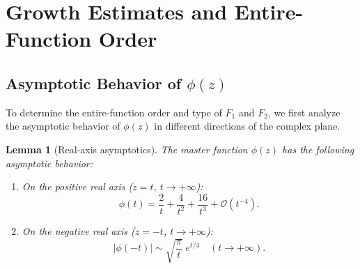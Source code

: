 \documentclass[11pt,a4paper]{article}
\theoremstyle{plain}
\newtheorem{lemma}[theorem]{Lemma}
\theoremstyle{definition}
\begin{document}
\section{Growth Estimates and Entire-Function Order}\label{sec:growth}

\subsection{Asymptotic Behavior of $\phi(z)$}

To determine the entire-function order and type of $F_1$ and $F_2$,
we first analyze the asymptotic behavior of $\phi(z)$ in different
directions of the complex plane.

\begin{lemma}[Real-axis asymptotics]\label{lem:phi-asymp}
The master function $\phi(z)$ has the following asymptotic behavior:
\begin{enumerate}[nosep,label=(\roman*)]
  \item On the positive real axis ($z = t$, $t \to +\infty$):
    \begin{equation}\label{eq:phi-pos-asymp}
      \phi(t) = \frac{2}{t} + \frac{4}{t^2} + \frac{16}{t^3}
      + \mathcal{O}(t^{-4}).
    \end{equation}
  \item On the negative real axis ($z = -t$, $t \to +\infty$):
    \begin{equation}\label{eq:phi-neg-asymp}
      |\phi(-t)| \sim \sqrt{\frac{\pi}{t}}\; e^{t/4}\quad
      (t \to +\infty).
    \end{equation}
\end{enumerate}
\end{lemma}
\end{document}
